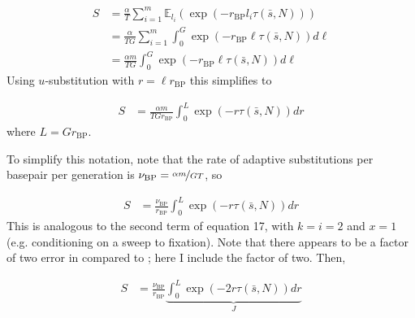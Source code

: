 \documentclass[11pt]{article}
\newcommand{\E}{\mathbb{E}}
\begin{document}
\begin{align}
  S &= \frac{\alpha}{T} \sum_{i=1}^m \E_{l_i} \left(\exp(-r_\text{BP} l_i \tau(\bar{s}, N)) \right) \\
    &= \frac{\alpha}{T G} \sum_{i=1}^m \int_0^{G} \exp(-r_\text{BP} \ell \tau(\bar{s}, N)) d\ell \\
    &= \frac{\alpha m}{T G} \int_0^{G} \exp(-r_\text{BP} \ell \tau(\bar{s}, N)) d\ell
\end{align}
%
Using $u$-substitution with $r = \ell r_\text{BP}$ this simplifies to

\begin{align}
  S &= \frac{\alpha m}{T G r_\text{BP}} \int_0^{L} \exp(-r \tau(\bar{s}, N)) dr
\end{align}
%
where $L = G r_\text{BP}$. 

To simplify this notation, note that the rate of adaptive substitutions per
basepair per generation is $\nu_\text{BP} = \nicefrac{\alpha m}{GT}$, so 

\begin{align}
  S &= \frac{\nu_\text{BP}}{r_\text{BP}} \int_0^{L} \exp(-r \tau(\bar{s}, N)) dr
\end{align}
%
This is analogous to the second term of \textcite{Coop2012-cd} equation 17,
with $k = i = 2$ and $x = 1$ (e.g.  conditioning on a sweep to fixation). Note
that there appears to be a factor of two error in \textcite{Elyashiv2016-vt}
compared to \textcite{Coop2012-cd}; here I include the factor of two.  Then,

\begin{align}
  S &= \frac{\nu_\text{BP}}{r_\text{BP}} \underbrace{\int_0^{L} \exp(-2r \tau(\bar{s}, N)) dr}_{J}
\end{align}
%
\end{document}
